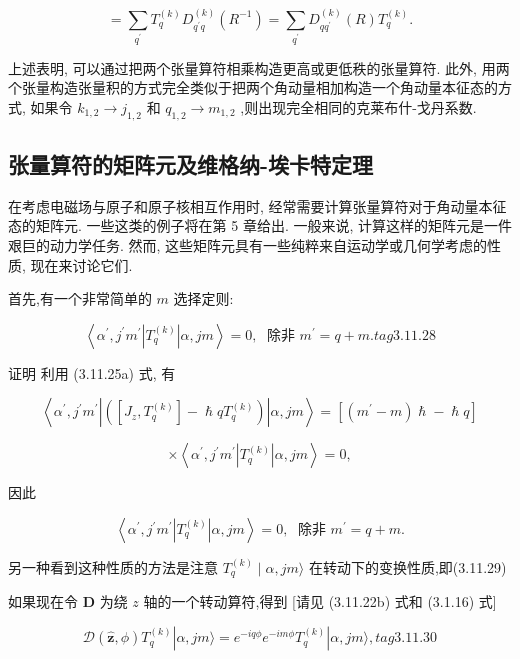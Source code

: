 $$
= \mathop{\sum }\limits_{{q}^{\prime }}{T}_{q}^{\left( k\right) }{D}_{{q}^{\prime }q}^{\left( k\right) }\left( {R}^{-1}\right) = \mathop{\sum }\limits_{{q}^{\prime }}{D}_{q{q}^{\prime }}^{\left( k\right) }\left( R\right) {T}_{q}^{\left( k\right) }.
$$

上述表明, 可以通过把两个张量算符相乘构造更高或更低秩的张量算符. 此外, 用两个张量构造张量积的方式完全类似于把两个角动量相加构造一个角动量本征态的方式, 如果令 ${k}_{1,2} \rightarrow {j}_{1,2}$ 和 ${q}_{1,2} \rightarrow {m}_{1,2}$ ,则出现完全相同的克莱布什-戈丹系数.

\subsection{张量算符的矩阵元及维格纳-埃卡特定理}

在考虑电磁场与原子和原子核相互作用时, 经常需要计算张量算符对于角动量本征态的矩阵元. 一些这类的例子将在第 5 章给出. 一般来说, 计算这样的矩阵元是一件艰巨的动力学任务. 然而, 这些矩阵元具有一些纯粹来自运动学或几何学考虑的性质, 现在来讨论它们.

首先,有一个非常简单的 $m$ 选择定则:

$$
\left\langle {{\alpha }^{\prime },{j}^{\prime }{m}^{\prime }\left| {T}_{q}^{\left( k\right) }\right| \alpha ,{jm}}\right\rangle = 0,\;\text{ 除非 }{m}^{\prime } = q + m. tag{3.11.28}
$$

证明 利用 (3.11.25a) 式, 有

$$
\left\langle {{\alpha }^{\prime },{j}^{\prime }{m}^{\prime }\left| \left( {\left\lbrack {{J}_{z},{T}_{q}^{\left( k\right) }}\right\rbrack - \hslash q{T}_{q}^{\left( k\right) }}\right) \right| \alpha ,{jm}}\right\rangle = \left\lbrack {\left( {{m}^{\prime } - m}\right) \hslash - \hslash q}\right\rbrack
$$

$$
\times \left\langle {{\alpha }^{\prime },{j}^{\prime }{m}^{\prime }\left| {T}_{q}^{\left( k\right) }\right| \alpha ,{jm}}\right\rangle = 0,
$$

因此

$$
\left\langle {{\alpha }^{\prime },{j}^{\prime }{m}^{\prime }\left| {T}_{q}^{\left( k\right) }\right| \alpha ,{jm}}\right\rangle = 0,\;\text{ 除非 }{m}^{\prime } = q + m.
$$

另一种看到这种性质的方法是注意 ${T}_{q}^{\left( k\right) } \mid \alpha ,{jm}\rangle$ 在转动下的变换性质,即(3.11.29)


如果现在令 $\mathbf{D}$ 为绕 $z$ 轴的一个转动算符,得到 [请见 (3.11.22b) 式和 (3.1.16) 式]

$$
\mathcal{D}\left( {\widehat{\mathbf{z}},\phi }\right) {T}_{q}^{\left( k\right) }\left| {\alpha ,{jm}\rangle = {e}^{-{iq\phi }}{e}^{-{im\phi }}{T}_{q}^{\left( k\right) }}\right| \alpha ,{jm}\rangle , tag{3.11.30}
$$

